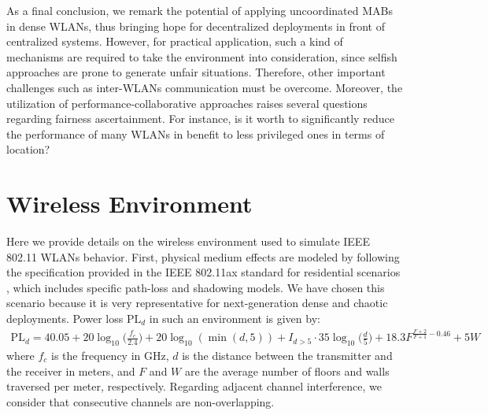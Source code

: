\documentclass[preprint,12pt]{elsarticle}
\begin{document}
As a final conclusion, we remark the potential of applying uncoordinated MABs in dense WLANs, thus bringing hope for decentralized deployments in front of centralized systems. However, for practical application, such a kind of mechanisms are required to take the environment into consideration, since selfish approaches are prone to generate unfair situations. Therefore, other important challenges such as inter-WLANs communication must be overcome. Moreover, the utilization of performance-collaborative approaches raises several questions regarding fairness ascertainment. For instance, is it worth to significantly reduce the performance of many WLANs in benefit to less privileged ones in terms of location?

\appendix
\section{Wireless Environment}
\label{section:simulated_wireless_environment}	
Here we provide details on the wireless environment used to simulate IEEE 802.11 WLANs behavior. First, physical medium effects are modeled by following the specification provided in the IEEE 802.11ax standard for residential scenarios \cite{merlin2015tgax}, which includes specific path-loss and shadowing models. We have chosen this scenario because it is very representative for next-generation dense and chaotic deployments. Power loss $\text{PL}_d$ in such an environment is given by:	
\begin{align}
	\text{PL}_d = 40.05 + 20 \log_{10}\Big(\frac{f_c}{2.4}\Big) + 20 \log_{10}(\min(d,5)) + \nonumber I_{d>5} \cdot 35\log_{10}\Big(\frac{d}{5}\Big) + 18.3 F^{\frac{F+2}{F+1}-0.46} + 5W
	\nonumber
\end{align}	
where $f_c$ is the frequency in GHz, $d$ is the distance between the transmitter and the receiver in meters, and $F$ and $W$ are the average number of floors and walls traversed per meter, respectively. Regarding adjacent channel interference, we consider that consecutive channels are non-overlapping. 
\end{document}
